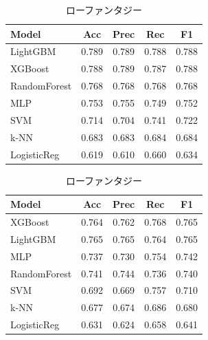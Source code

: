 \documentclass[uplatex, dvipdfmx, 11pt, a4paper, report]{jsbook}
\begin{document}
\begin{table}[H]
  \small
  \begin{minipage}[t]{0.49\textwidth}
    \centering
    \caption{ハイファンタジー}
    \begin{tabular}{l|c|c|c|c} \hline
      Model & Acc & Prec & Rec & F1 \\ \hline
      LightGBM & 0.789 & 0.789 & 0.788 & 0.788 \\
      XGBoost & 0.788 & 0.789 & 0.787 & 0.788 \\
      RandomForest & 0.768 & 0.768 & 0.768 & 0.768 \\
      MLP & 0.753 & 0.755 & 0.749 & 0.752 \\
      SVM & 0.714 & 0.704 & 0.741 & 0.722 \\
      k-NN & 0.683 & 0.683 & 0.684 & 0.684 \\
      LogisticReg & 0.619 & 0.610 & 0.660 & 0.634 \\ \hline
    \end{tabular}
  \end{minipage}
  \hfill
  \begin{minipage}[t]{0.49\textwidth}
    \centering
    \caption{ローファンタジー}
    \begin{tabular}{l|c|c|c|c} \hline
      Model & Acc & Prec & Rec & F1 \\ \hline
      XGBoost & 0.764 & 0.762 & 0.768 & 0.765 \\
      LightGBM & 0.765 & 0.765 & 0.764 & 0.765 \\
      MLP & 0.737 & 0.730 & 0.754 & 0.742 \\
      RandomForest & 0.741 & 0.744 & 0.736 & 0.740 \\
      SVM & 0.692 & 0.669 & 0.757 & 0.710 \\
      k-NN & 0.677 & 0.674 & 0.686 & 0.680 \\
      LogisticReg & 0.631 & 0.624 & 0.658 & 0.641 \\ \hline
    \end{tabular}
  \end{minipage}
\end{table}
\end{document}
